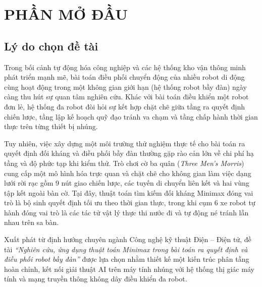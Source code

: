 \documentclass[12pt,a4paper]{report}
\begin{document}
	\clearpage
	\setcounter{page}{1}
	
	\renewcommand{\thesection}{\arabic{section}}
	
	\chapter*{PHẦN MỞ ĐẦU}
	
	\section{Lý do chọn đề tài}
	Trong bối cảnh tự động hóa công nghiệp và các hệ thống kho vận thông minh phát triển mạnh mẽ, bài toán điều phối chuyển động của nhiều robot di động cùng hoạt động trong một không gian giới hạn (hệ thống robot bầy đàn) ngày càng thu hút sự quan tâm nghiên cứu. Khác với bài toán điều khiển một robot đơn lẻ, hệ thống đa robot đòi hỏi sự kết hợp chặt chẽ giữa tầng ra quyết định chiến lược, tầng lập kế hoạch quỹ đạo tránh va chạm và tầng chấp hành thời gian thực trên từng thiết bị nhúng.
	
	Tuy nhiên, việc xây dựng một môi trường thử nghiệm thực tế cho bài toán ra quyết định đối kháng và điều phối bầy đàn thường gặp rào cản lớn về chi phí hạ tầng và độ phức tạp khi kiểm thử. Trò chơi cờ ba quân (\textit{Three Men's Morris}) cung cấp một mô hình hóa trực quan và chặt chẽ cho không gian làm việc dạng lưới rời rạc gồm 9 nút giao chiến lược, các tuyến di chuyển liên kết và hai vùng tập kết ngoài bàn cờ. Tại đây, thuật toán tìm kiếm đối kháng Minimax đóng vai trò là bộ sinh quyết định tối ưu theo thời gian thực, trong khi cụm 6 xe robot tự hành đóng vai trò là các tác tử vật lý thực thi nước đi và tự động né tránh lẫn nhau trên sa bàn.
	
	Xuất phát từ định hướng chuyên ngành Công nghệ kỹ thuật Điện -- Điện tử, đề tài \textit{``Nghiên cứu, ứng dụng thuật toán Minimax trong bài toán ra quyết định và điều phối robot bầy đàn''} được lựa chọn nhằm thiết kế một kiến trúc phân tầng hoàn chỉnh, kết nối giải thuật AI trên máy tính nhúng với hệ thống thị giác máy tính và mạng truyền thông không dây điều khiển đa robot.
	
\end{document}
